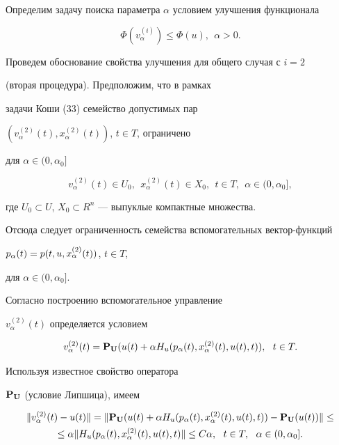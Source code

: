 Определим задачу поиска параметра $\alpha$ условием улучшения функционала


$$


\Phi(v_{\alpha}^{(i)}) \leq \Phi(u),\ \ \alpha>0.


$$





Проведем обоснование свойства улучшения для общего случая с $i=2$


(вторая процедура). Предположим, что в рамках


задачи Коши (33) семейство допустимых пар


$(v_{\alpha}^{(2)}(t), x_{\alpha}^{(2)}(t))$, $t \in T$, ограничено


для $\alpha \in (0, \alpha_{0}]$


$$


v_{\alpha}^{(2)}(t) \in U_{0},\ \ x_{\alpha}^{(2)}(t) \in X_{0},


\ \ t \in T, \ \ \alpha \in (0,\alpha_{0}],


$$


где $U_0\subset U$, $X_0\subset R^{n}$ --- выпуклые компактные множества.





Отсюда следует ограниченность семейства вспомогательных вектор-функций


$p_{\alpha}(t)=\linebreak p(t, u,x_{\alpha}^{(2)}(t))$, $t \in T$,


для $\alpha \in (0, \alpha_{0}]$.





Согласно построению вспомогательное управление


$v_{\alpha}^{(2)}(t)$ определяется условием


\begin{equation}


v_{\alpha}^{(2)}(t)={\bold{P}_{\bold U}}(u(t)+


\alpha H_{u}(p_{\alpha}(t), x_{\alpha}^{(2)}(t), u(t), t)),\ \ t \in T.


\end{equation}


Используя известное свойство оператора


${\bold{P}_{\bold U}}$ (условие Липшица), имеем


\begin{multline*}


\| v_{\alpha}^{(2)}(t) - u(t)\|=


\| {\bold{P}_{\bold U}}(u(t)+\alpha H_{u}(p_{\alpha}(t),


x_{\alpha}^{(2)}(t), u(t), t)) - {\bold{P}_{\bold U}}(u(t))\| \leq \\


\leq \alpha \| H_{u}(p_{\alpha}(t), x_{\alpha}^{(2)}(t), u(t), t)\|


\leq C \alpha,\ \ t \in T,\ \ \alpha \in (0,\alpha_{0}].


\end{multline*}






